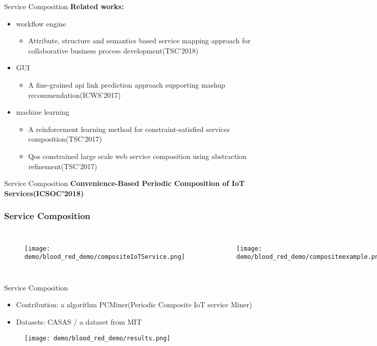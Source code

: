 \documentclass[notheorems, aspectratio=54]{beamer}
\begin{document}
\begin{frame}{Service Composition}
    \textbf{Related works:}
    \begin{itemize}
        \item workflow engine
        \begin{itemize}
            \item Attribute, structure and semantics based service mapping approach for collaborative business process development(TSC'2018)
        \end{itemize}
        \item GUI
        \begin{itemize}
            \item A fine-grained api link prediction approach supporting mashup recommendation(ICWS'2017)
        \end{itemize}
         \item machine learning
        \begin{itemize}
            \item A reinforcement learning method for constraint-satisfied services composition(TSC'2017)
            \item Qos constrained large scale web service composition using abstraction refinement(TSC'2017)
        \end{itemize}
    \end{itemize}
\end{frame}

\begin{frame}{Service Composition}
    \textbf{Convenience-Based Periodic Composition of IoT Services(ICSOC'2018)}
    \frametitle{Service Composition}
    \begin{columns}
       \begin{figure}[t]
     \texttt{[image: demo/blood\_red\_demo/compositeIoTService.png]}
    \centering
    \end{figure}
       \begin{figure}[t]
     \texttt{[image: demo/blood\_red\_demo/compositeexample.png]}
    \centering
    \end{figure}
    \end{columns}
\end{frame}

\begin{frame}{Service Composition}
    \begin{itemize}
        \item Contribution: a algorithm PCMiner(Periodic Composite IoT service Miner)
        \item Datasets: CASAS / a dataset from MIT
    \end{itemize}
    \begin{figure}[t]
    \texttt{[image: demo/blood\_red\_demo/results.png]}
    \centering
    \end{figure}
\end{frame}
\end{document}
